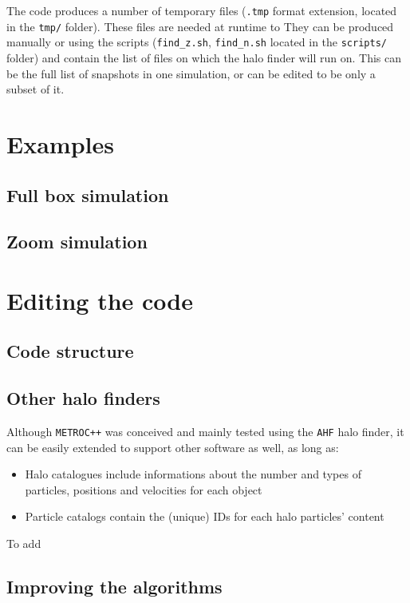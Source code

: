 \documentclass{article}
\begin{document}
The code produces a number of temporary files (\texttt{.tmp} format extension, located in the \texttt{tmp/} folder).
These files are needed at runtime to 
They can be produced manually or using the scripts (\texttt{find\_z.sh}, \texttt{find\_n.sh} located in the \texttt{scripts/} folder)
and contain the list of files on which the halo finder will run on.
This can be the full list of snapshots in one simulation, or can be edited to be only a subset of it.


\section{Examples}
\subsection{Full box simulation}
\subsection{Zoom simulation}

\section{Editing the code}
\subsection{Code structure}
\subsection{Other halo finders}

Although \texttt{METROC++} was conceived and mainly tested using the \texttt{AHF} halo finder, it can be easily extended to 
support other software as well, as long as:

\begin{itemize}
\item Halo catalogues include informations about the number and types of particles, positions and velocities for each object
\item Particle catalogs contain the (unique) IDs for each halo particles' content
\end{itemize}

To add 

\subsection{Improving the algorithms}
\end{document}
